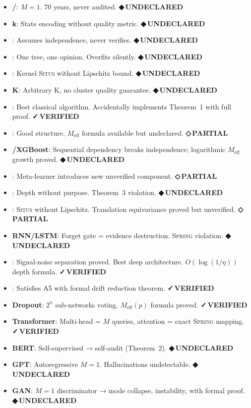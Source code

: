 \documentclass[12pt,a4paper]{article}
\theoremstyle{definition}
\newcommand{\guilty}{{\color{guiltycolor}\textbf{◆\,UNDECLARED}}}
\newcommand{\weakness}{{\color{weakcolor}\textbf{◇\,PARTIAL}}}
\newcommand{\verified}{{\color{verifiedcolor}\textbf{✓\,VERIFIED}}}
\newcommand{\Situs}{\textsc{Situs}}
\newcommand{\Spring}{\textsc{Spring}}
\begin{document}
\begin{itemize}[nosep]
    \item \textbf{/}: $M=1$. 70 years, never audited. \guilty{}
    \item \textbf{k}: State encoding without quality metric. \guilty{}
    \item \textbf{}: Assumes independence, never verifies. \guilty{}
    \item \textbf{}: One tree, one opinion. Overfits silently. \guilty{}
    \item \textbf{}: Kernel \Situs{} without Lipschitz bound. \guilty{}
    \item \textbf{K}: Arbitrary K, no cluster quality guarantee. \guilty{}
    \item \textbf{}: Best classical algorithm. Accidentally implements Theorem~1 with full proof. \verified{}
    \item \textbf{}: Good structure, $M_{\text{eff}}$ formula available but undeclared. \weakness{}
    \item \textbf{/XGBoost}: Sequential dependency breaks independence; logarithmic $M_{\text{eff}}$ growth proved. \guilty{}
    \item \textbf{}: Meta-learner introduces new unverified component. \weakness{}
    \item \textbf{}: Depth without purpose. Theorem~3 violation. \guilty{}
    \item \textbf{}: \Situs{} without Lipschitz. Translation equivariance proved but unverified. \weakness{}
    \item \textbf{RNN/LSTM}: Forget gate = evidence destruction. \Spring{} violation. \guilty{}
    \item \textbf{}: Signal-noise separation proved. Best deep architecture. $O(\log(1/\eta))$ depth formula. \verified{}
    \item \textbf{}: Satisfies A5 with formal drift reduction theorem. \verified{}
    \item \textbf{Dropout}: $2^n$ sub-networks voting. $M_{\text{eff}}(p)$ formula proved. \verified{}
    \item \textbf{Transformer}: Multi-head = $M$ queries, attention = exact \Spring{} mapping. \verified{}
    \item \textbf{BERT}: Self-supervised → self-audit (Theorem~2). \guilty{}
    \item \textbf{GPT}: Autoregressive $M=1$. Hallucinations undetectable. \guilty{}
    \item \textbf{GAN}: $M=1$ discriminator → mode collapse, instability, with formal proof. \guilty{}

\end{itemize}
\end{document}
